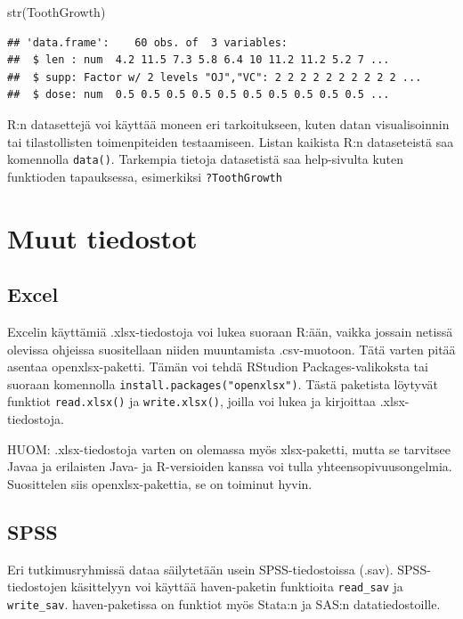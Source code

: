 \documentclass[
]{book}
\newenvironment{Shaded}{\begin{snugshade}}{\end{snugshade}}
\newcommand{\FunctionTok}[1]{\textcolor[rgb]{0.00,0.00,0.00}{#1}}
\newcommand{\NormalTok}[1]{#1}
\begin{document}
\begin{Shaded}
\begin{Highlighting}[]
\FunctionTok{str}\NormalTok{(ToothGrowth)}
\end{Highlighting}
\end{Shaded}

\begin{verbatim}
## 'data.frame':    60 obs. of  3 variables:
##  $ len : num  4.2 11.5 7.3 5.8 6.4 10 11.2 11.2 5.2 7 ...
##  $ supp: Factor w/ 2 levels "OJ","VC": 2 2 2 2 2 2 2 2 2 2 ...
##  $ dose: num  0.5 0.5 0.5 0.5 0.5 0.5 0.5 0.5 0.5 0.5 ...
\end{verbatim}

R:n datasettejä voi käyttää moneen eri tarkoitukseen, kuten datan visualisoinnin tai tilastollisten toimenpiteiden testaamiseen. Listan kaikista R:n dataseteistä saa komennolla \texttt{data()}. Tarkempia tietoja datasetistä saa help-sivulta kuten funktioden tapauksessa, esimerkiksi \texttt{?ToothGrowth}

\hypertarget{muut-tiedostot}{%
\section{Muut tiedostot}\label{muut-tiedostot}}

\hypertarget{excel}{%
\subsection{Excel}\label{excel}}

Excelin käyttämiä .xlsx-tiedostoja voi lukea suoraan R:ään, vaikka jossain netissä olevissa ohjeissa suositellaan niiden muuntamista .csv-muotoon. Tätä varten pitää asentaa openxlsx-paketti. Tämän voi tehdä RStudion Packages-valikoksta tai suoraan komennolla \texttt{install.packages("openxlsx")}. Tästä paketista löytyvät funktiot \texttt{read.xlsx()} ja \texttt{write.xlsx()}, joilla voi lukea ja kirjoittaa .xlsx-tiedostoja.

HUOM: .xlsx-tiedostoja varten on olemassa myös xlsx-paketti, mutta se tarvitsee Javaa ja erilaisten Java- ja R-versioiden kanssa voi tulla yhteensopivuusongelmia. Suosittelen siis openxlsx-pakettia, se on toiminut hyvin.

\hypertarget{spss}{%
\subsection{SPSS}\label{spss}}

Eri tutkimusryhmissä dataa säilytetään usein SPSS-tiedostoissa (.sav). SPSS-tiedostojen käsittelyyn voi käyttää haven-paketin funktioita \texttt{read\_sav} ja \texttt{write\_sav}. haven-paketissa on funktiot myös Stata:n ja SAS:n datatiedostoille.
\end{document}
